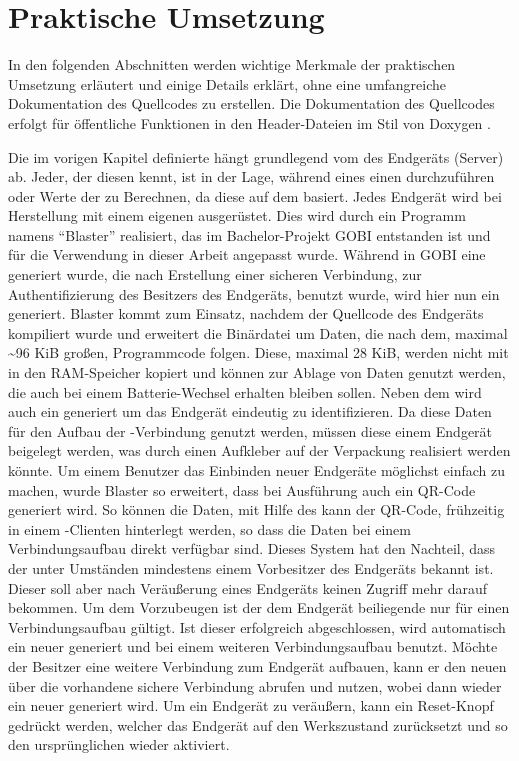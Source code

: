 \chapter{Praktische Umsetzung}

In den folgenden Abschnitten werden wichtige Merkmale der praktischen Umsetzung erläutert und einige Details erklärt,
ohne eine umfangreiche Dokumentation des Quellcodes zu erstellen. Die Dokumentation des Quellcodes erfolgt für öffentliche
Funktionen in den Header-Dateien im Stil von Doxygen \cite{doxygen}.

Die im vorigen Kapitel definierte  hängt grundlegend vom  des Endgeräts (Server) ab. Jeder, der diesen kennt, ist in
der Lage, während eines  einen  durchzuführen oder Werte der  zu Berechnen, da diese auf dem  basiert.
Jedes Endgerät wird bei Herstellung mit einem eigenen  ausgerüstet. Dies wird durch ein Programm namens "`Blaster"' realisiert, das
im Bachelor-Projekt GOBI entstanden ist und für die Verwendung in dieser Arbeit angepasst wurde. Während in GOBI eine  generiert wurde,
die nach Erstellung einer sicheren Verbindung, zur Authentifizierung des Besitzers des Endgeräts, benutzt wurde, wird hier nun ein 
generiert. Blaster kommt zum Einsatz, nachdem der Quellcode des Endgeräts kompiliert wurde und erweitert die Binärdatei um Daten, die nach dem,
maximal \textasciitilde 96 KiB großen, Programmcode folgen. Diese, maximal 28 KiB, werden nicht mit in den RAM-Speicher kopiert und können zur
Ablage von Daten genutzt werden, die auch bei einem Batterie-Wechsel erhalten bleiben sollen. Neben dem  wird auch ein 
generiert um das Endgerät eindeutig zu identifizieren. Da diese Daten für den Aufbau der -Verbindung genutzt werden, müssen diese
einem Endgerät beigelegt werden, was durch einen Aufkleber auf der Verpackung realisiert werden könnte. Um einem Benutzer das Einbinden neuer
Endgeräte möglichst einfach zu machen, wurde Blaster so erweitert, dass bei Ausführung auch ein QR-Code generiert wird. So können die Daten, mit
Hilfe des kann der QR-Code, frühzeitig in einem -Clienten hinterlegt werden, so dass die Daten bei einem Verbindungsaufbau direkt
verfügbar sind. Dieses System hat
den Nachteil, dass der  unter Umständen mindestens einem Vorbesitzer des Endgeräts bekannt ist. Dieser soll aber nach Veräußerung eines
Endgeräts keinen Zugriff mehr darauf bekommen. Um dem Vorzubeugen ist der dem Endgerät beiliegende  nur für einen Verbindungsaufbau
gültigt. Ist dieser erfolgreich abgeschlossen, wird automatisch ein neuer  generiert und bei einem weiteren Verbindungsaufbau benutzt.
Möchte der Besitzer eine weitere Verbindung zum Endgerät aufbauen, kann er den neuen  über die vorhandene sichere Verbindung abrufen
und nutzen, wobei dann wieder ein neuer  generiert wird. Um ein Endgerät zu veräußern, kann ein Reset-Knopf gedrückt werden, welcher das
Endgerät auf den Werkszustand zurücksetzt und so den ursprünglichen  wieder aktiviert.



